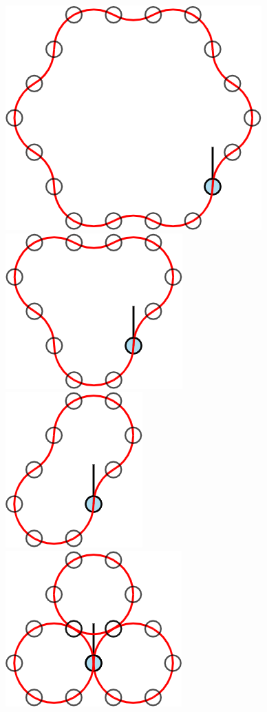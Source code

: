 \documentclass{article}
\begin{document}
\begin{figure}[ht!]
  \centering
  \includegraphics[scale=0.12]{assets/robot_walks/079_problem_6-robot_1_2.png}
  \includegraphics[scale=0.12]{assets/robot_walks/079_problem_6-robot_1_3.png}
  \includegraphics[scale=0.12]{assets/robot_walks/079_problem_6-robot_1_4.png}
  \includegraphics[scale=0.12]{assets/robot_walks/079_problem_6-robot_1_5.png}

\end{figure}
\end{document}
